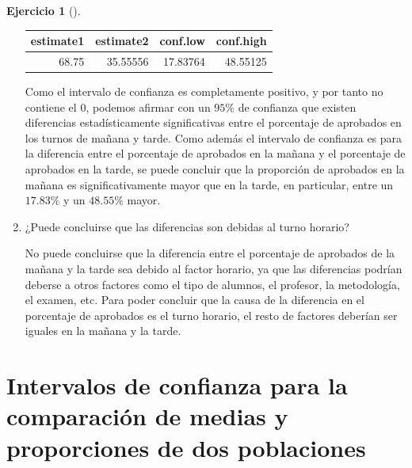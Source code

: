 \documentclass[
  a4paper,
]{scrreport}
\theoremstyle{definition}
\newtheorem{exercise}{Ejercicio}[chapter]
\theoremstyle{remark}
\begin{document}
\begin{exercise}[]
\begin{enumerate}
\begin{tcolorbox}
  \begin{tabular}{r|r|r|r}
  \hline
  estimate1 & estimate2 & conf.low & conf.high\\
  \hline
  68.75 & 35.55556 & 17.83764 & 48.55125\\
  \hline
  \end{tabular}

  Como el intervalo de confianza es completamente positivo, y por tanto
  no contiene el \(0\), podemos afirmar con un \(95\%\) de confianza que
  existen diferencias estadísticamente significativas entre el
  porcentaje de aprobados en los turnos de mañana y tarde. Como además
  el intervalo de confianza es para la diferencia entre el porcentaje de
  aprobados en la mañana y el porcentaje de aprobados en la tarde, se
  puede concluir que la proporción de aprobados en la mañana es
  significativamente mayor que en la tarde, en particular, entre un
  \(17.83\%\) y un \(48.55\%\) mayor.

  \end{tcolorbox}
\item
  ¿Puede concluirse que las diferencias son debidas al turno horario?

  \begin{tcolorbox}[enhanced jigsaw, coltitle=black, left=2mm, colback=white, leftrule=.75mm, toptitle=1mm, breakable, bottomrule=.15mm, titlerule=0mm, bottomtitle=1mm, title=\textcolor{quarto-callout-tip-color}{\faLightbulb}\hspace{0.5em}{Solución}, arc=.35mm, toprule=.15mm, rightrule=.15mm, colframe=quarto-callout-tip-color-frame, opacityback=0, colbacktitle=quarto-callout-tip-color!10!white, opacitybacktitle=0.6]

  No puede concluirse que la diferencia entre el porcentaje de aprobados
  de la mañana y la tarde sea debido al factor horario, ya que las
  diferencias podrían deberse a otros factores como el tipo de alumnos,
  el profesor, la metodología, el examen, etc. Para poder concluir que
  la causa de la diferencia en el porcentaje de aprobados es el turno
  horario, el resto de factores deberían ser iguales en la mañana y la
  tarde.

  \end{tcolorbox}
\end{enumerate}

\end{exercise}


\hypertarget{intervalos-de-confianza-para-la-comparaciuxf3n-de-medias-y-proporciones-de-dos-poblaciones-1}{%
\chapter{Intervalos de confianza para la comparación de medias y
proporciones de dos
poblaciones}\label{intervalos-de-confianza-para-la-comparaciuxf3n-de-medias-y-proporciones-de-dos-poblaciones-1}}
\end{document}

